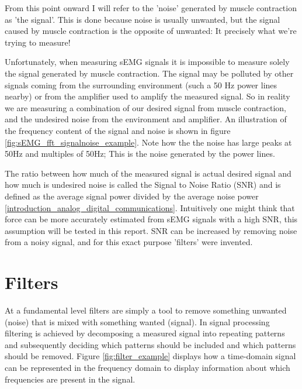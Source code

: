 From this point onward I will refer to the 'noise' generated by muscle contraction as 'the signal'. This is done because noise is usually unwanted, but the signal caused by muscle contraction is the opposite of unwanted: It precisely what we're trying to measure! 

Unfortunately, when measuring sEMG signals it is impossible to measure solely the signal generated by muscle contraction. The signal may be polluted by other signals coming from the surrounding environment (such a 50 Hz power lines nearby) or from the amplifier used to amplify the measured signal. So in reality we are measuring a combination of our desired signal from muscle contraction, and the undesired noise from the environment and amplifier. An illustration of the frequency content of the signal and noise is shown in figure \ref{fig:sEMG_fft_signalnoise_example}. Note how the the noise has large peaks at 50Hz and multiples of 50Hz; This is the noise generated by the power lines. 

The ratio between how much of the measured signal is actual desired signal and how much is undesired noise is called the Signal to Noise Ratio (SNR) and is defined as the average signal power divided by the average noise power \ref{introduction_analog_digital_communications}. Intuitively one might think that force can be more accurately estimated from sEMG signals with a high SNR, this assumption will be tested in this report. SNR can be increased by removing noise from a noisy signal, and for this exact purpose 'filters' were invented.

\section{Filters}
At a fundamental level filters are simply a tool to remove something unwanted (noise) that is mixed with something wanted (signal). In signal processing filtering is achieved by decomposing a measured signal into repeating patterns and subsequently deciding which patterns should be included and which patterns should be removed. Figure \ref{fig:filter_example} displays how a time-domain signal can be represented in the frequency domain to display information about which frequencies are present in the signal.


